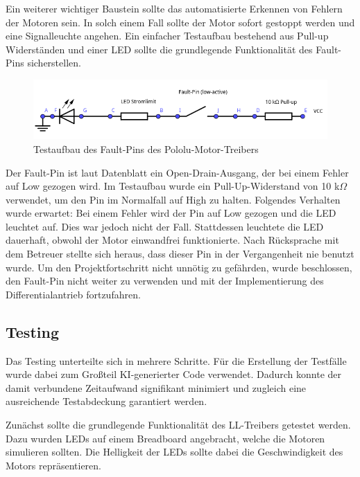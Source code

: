Ein weiterer wichtiger Baustein sollte das automatisierte Erkennen von Fehlern der Motoren sein. In solch einem Fall sollte der Motor sofort gestoppt werden und eine Signalleuchte angehen. Ein einfacher Testaufbau bestehend aus Pull-up Widerständen und einer LED sollte die grundlegende Funktionalität des Fault-Pins sicherstellen.

\begin{figure}[h]
    \centering
    \includegraphics[width=\textwidth]{images/motor_driver_fault_pin.png}
    \caption{Testaufbau des Fault-Pins des Pololu-Motor-Treibers}
    \label{fig:motor_driver_fault_pin}
\end{figure}

Der Fault-Pin ist laut Datenblatt ein Open-Drain-Ausgang, der bei einem Fehler auf Low gezogen wird. Im Testaufbau wurde ein Pull-Up-Widerstand von 10 k$\Omega$ verwendet, um den Pin im Normalfall auf High zu halten. Folgendes Verhalten wurde erwartet: Bei einem Fehler wird der Pin auf Low gezogen und die LED leuchtet auf. Dies war jedoch nicht der Fall. Stattdessen leuchtete die LED dauerhaft, obwohl der Motor einwandfrei funktionierte. Nach Rücksprache mit dem Betreuer stellte sich heraus, dass dieser Pin in der Vergangenheit nie benutzt wurde. Um den Projektfortschritt nicht unnötig zu gefährden, wurde beschlossen, den Fault-Pin nicht weiter zu verwenden und mit der Implementierung des Differentialantrieb fortzufahren.

\subsection{Testing}

Das Testing unterteilte sich in mehrere Schritte. Für die Erstellung der Testfälle wurde dabei zum Großteil KI-generierter Code verwendet. Dadurch konnte der damit verbundene Zeitaufwand signifikant minimiert und zugleich eine ausreichende Testabdeckung garantiert werden. \newline

Zunächst sollte die grundlegende Funktionalität des LL-Treibers getestet werden. Dazu wurden LEDs auf einem Breadboard angebracht, welche die Motoren simulieren sollten. Die Helligkeit der LEDs sollte dabei die Geschwindigkeit des Motors repräsentieren. \newline

